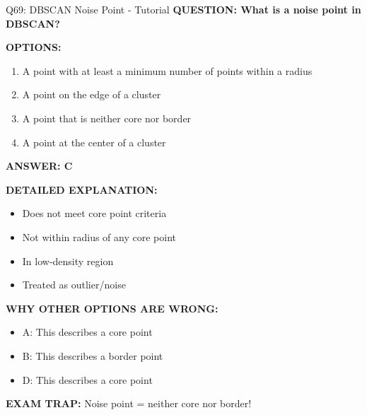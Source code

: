 \documentclass[8pt]{beamer}
\begin{document}
	\begin{frame}{Q69: DBSCAN Noise Point - Tutorial}
		\fontsize{6.5}{7.5}\selectfont
		\textbf{QUESTION: What is a noise point in DBSCAN?}
		
		\vspace{0.1cm}
		\textbf{OPTIONS:}
		\begin{enumerate}
			\item A point with at least a minimum number of points within a radius
			\item A point on the edge of a cluster
			\item A point that is neither core nor border
			\item A point at the center of a cluster
		\end{enumerate}
		
		\vspace{0.1cm}
		\textcolor{myblue}{\textbf{ANSWER: C}}
		
		\vspace{0.1cm}
		\textbf{DETAILED EXPLANATION:}
		\begin{itemize}
			\item Does not meet core point criteria
			\item Not within radius of any core point
			\item In low-density region
			\item Treated as outlier/noise
		\end{itemize}
		
		\vspace{0.1cm}
		\textcolor{myred}{\textbf{WHY OTHER OPTIONS ARE WRONG:}}
		\begin{itemize}
			\item \textcolor{myred}{A:} This describes a core point
			\item \textcolor{myred}{B:} This describes a border point
			\item \textcolor{myred}{D:} This describes a core point
		\end{itemize}
		
		\textcolor{myred}{\textbf{EXAM TRAP:}} Noise point = \textcolor{myblue}{neither core nor border}!
	\end{frame}
	
\end{document}
